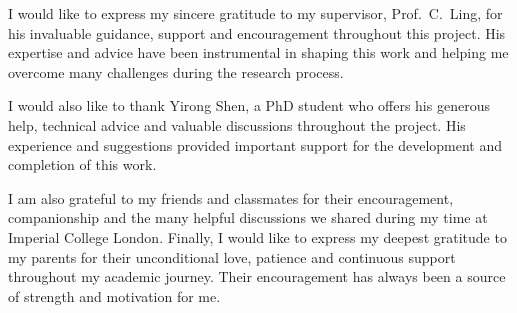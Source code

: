 
I would like to express my sincere gratitude to my supervisor,
Prof.~C.~Ling, for his invaluable guidance, support and encouragement
throughout this project. His expertise and advice have been instrumental
in shaping this work and helping me overcome many challenges during the
research process.

I would also like to thank Yirong Shen, a PhD student who offers his generous help, technical
advice and valuable discussions throughout the project. His experience
and suggestions provided important support for the development and
completion of this work.

I am also grateful to my friends and classmates for their encouragement,
companionship and the many helpful discussions we shared during my time
at Imperial College London. Finally, I would like to express my deepest
gratitude to my parents for their unconditional love, patience and
continuous support throughout my academic journey. Their encouragement
has always been a source of strength and motivation for me.